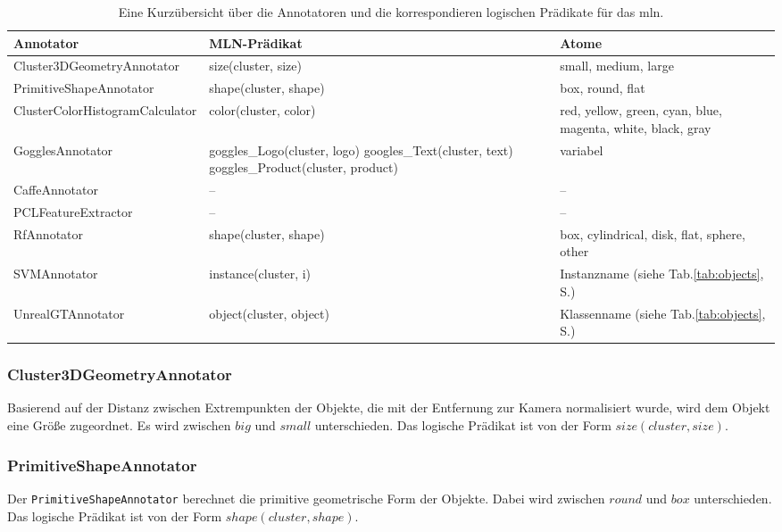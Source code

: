 \begin{table}
\begin{tabularx}{\textwidth}{lXX}
\textbf{Annotator}				& \textbf{MLN-Prädikat}	& \textbf{Atome}	\\ \hline 
Cluster3DGeometryAnnotator		& size(cluster, size)	& small, medium, large	\\ 
PrimitiveShapeAnnotator			& shape(cluster, shape)	& box, round, flat 	\\ 
ClusterColorHistogramCalculator  & color(cluster, color)	& red, yellow, green, cyan, blue, magenta, white, black, gray \\ 
GogglesAnnotator				& goggles\_Logo(cluster, logo) \newline googles\_Text(cluster, text)  \newline goggles\_Product(cluster, product)	& 	variabel	\\ 
CaffeAnnotator					& --					& --	\\
PCLFeatureExtractor				& --					& --	\\ 
RfAnnotator						& shape(cluster, shape)	&	box, cylindrical, disk, flat, sphere, other	\\
SVMAnnotator					& instance(cluster, i)	& Instanzname (siehe Tab.\ref{tab:objects}, S.\pageref{tab:objects}) \\
UnrealGTAnnotator				& object(cluster, object)	& Klassenname (siehe Tab.\ref{tab:objects}, S.\pageref{tab:objects})	\\ \hline 
\end{tabularx}
\caption[Kurzübersicht der Annotatoren]{Eine Kurzübersicht über die Annotatoren und die korrespondieren logischen Prädikate für das \gls{mln}.}
\label{tab:annotators}
\end{table}

\subsubsection{Cluster3DGeometryAnnotator}
Basierend auf der Distanz zwischen Extrempunkten der Objekte, die mit der Entfernung zur Kamera normalisiert wurde, wird dem Objekt eine Größe zugeordnet. Es wird zwischen $big$ und $small$ unterschieden. Das logische Prädikat ist von der Form $size(cluster,  size)$. 

\subsubsection{PrimitiveShapeAnnotator} 
Der \texttt{PrimitiveShapeAnnotator} berechnet die primitive geometrische Form der Objekte.  Dabei wird zwischen $round$ und $box$ unterschieden. Das logische Prädikat ist von der Form $shape(cluster,  shape)$.
   
